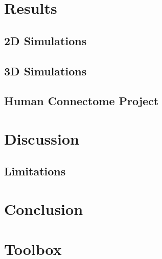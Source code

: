 \section{Results}
\label{sec:Results}

\subsection{2D Simulations}

\subsection{3D Simulations}

\subsection{Human Connectome Project}

\section{Discussion}

\subsection{Limitations}

\section{Conclusion}

\section{Toolbox}